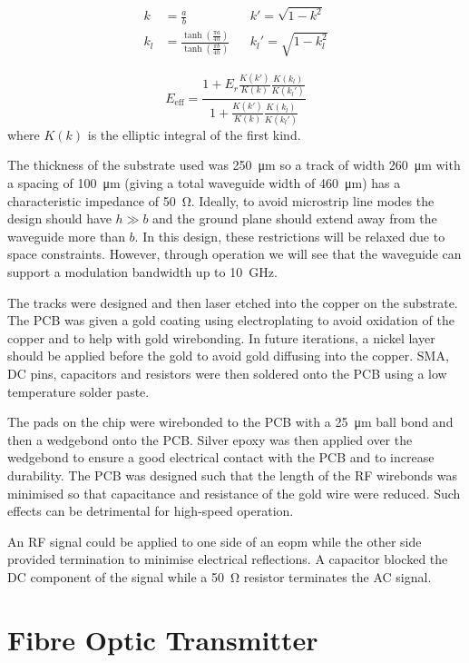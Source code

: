 \begin{align}
	k &= \frac{a}{b} &&k' = \sqrt{1 - k^2}\\
	k_l &= \frac{\tanh\left(\frac{\pi a}{4 h}\right)}{\tanh\left(\frac{\pi b}{4 h}\right)} &&k_l' = \sqrt{1 - k_l^2}
\end{align}

\begin{equation}
	E_\text{eff} = \frac{1 + E_r \frac{K(k')}{K(k)} \frac{K(k_l)}{K(k_l')}}{1 + \frac{K(k')}{K(k)} \frac{K(k_l)}{K(k_l')}}
\end{equation}
where $K(k)$ is the elliptic integral of the first kind. 

The thickness of the substrate used was \SI{250}{\um} so a track of width \SI{260}{\um} with a spacing of \SI{100}{\um} (giving a total waveguide width of \SI{460}{\um}) has a characteristic impedance of \SI{50}{\ohm}. Ideally, to avoid microstrip line modes the design should have $h \gg b$ and the ground plane should extend away from the waveguide more than $b$\cite{riaziat1987}. In this design, these restrictions will be relaxed due to space constraints. However, through operation we will see that the waveguide can support a modulation bandwidth up to \SI{10}{GHz}.

The tracks were designed and then laser etched into the copper on the substrate. The PCB was given a gold coating using electroplating to avoid oxidation of the copper and to help with gold wirebonding. In future iterations, a nickel layer should be applied before the gold to avoid gold diffusing into the copper. SMA, DC pins, capacitors and resistors were then soldered onto the PCB using a low temperature solder paste.

The pads on the chip were wirebonded to the PCB with a \SI{25}{\micro\meter} ball bond and then a wedgebond onto the PCB. Silver epoxy was then applied over the wedgebond to ensure a good electrical contact with the PCB and to increase durability. The PCB was designed such that the length of the RF wirebonds was minimised so that capacitance and resistance of the gold wire were reduced. Such effects can be detrimental for high-speed operation.

An RF signal could be applied to one side of an \ac{eopm} while the other side provided termination to minimise electrical reflections. A capacitor blocked the DC component of the signal while a \SI{50}{\ohm} resistor terminates the AC signal. 

\section{Fibre Optic Transmitter}

